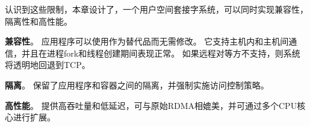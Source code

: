 



认识到这些限制，本章设计了\sys {}，一个用户空间套接字系统，可以同时实现兼容性，隔离性和高性能。
\begin{ecompact}
\item \textbf {兼容性}。
应用程序可以使用\sys {}作为替代品而无需修改。
它支持主机内和主机间通信，并且在进程fork和线程创建期间表现正常。
如果远程对等方不支持\sys {}，则系统将透明地回退到TCP。
\item \textbf {隔离}。
\sys {}保留了应用程序和容器之间的隔离，并强制实施访问控制策略。
\item \textbf {高性能}。
\sys {}提供高吞吐量和低延迟，可与原始RDMA相媲美，并可通过多个CPU核心进行扩展。
\end{ecompact}


